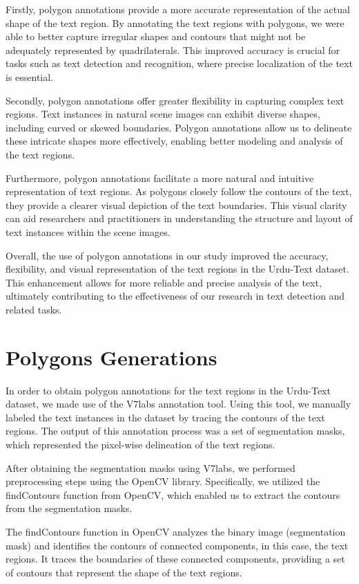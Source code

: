 Firstly, polygon annotations provide a more accurate representation of the actual shape of the text region. By annotating the text regions with polygons, we were able to better capture irregular shapes and contours that might not be adequately represented by quadrilaterals. This improved accuracy is crucial for tasks such as text detection and recognition, where precise localization of the text is essential.

Secondly, polygon annotations offer greater flexibility in capturing complex text regions. Text instances in natural scene images can exhibit diverse shapes, including curved or skewed boundaries. Polygon annotations allow us to delineate these intricate shapes more effectively, enabling better modeling and analysis of the text regions.

Furthermore, polygon annotations facilitate a more natural and intuitive representation of text regions. As polygons closely follow the contours of the text, they provide a clearer visual depiction of the text boundaries. This visual clarity can aid researchers and practitioners in understanding the structure and layout of text instances within the scene images.

Overall, the use of polygon annotations in our study improved the accuracy, flexibility, and visual representation of the text regions in the Urdu-Text dataset. This enhancement allows for more reliable and precise analysis of the text, ultimately contributing to the effectiveness of our research in text detection and related tasks.

\section{Polygons Generations}
In order to obtain polygon annotations for the text regions in the Urdu-Text dataset, we made use of the V7labs annotation tool. Using this tool, we manually labeled the text instances in the dataset by tracing the contours of the text regions. The output of this annotation process was a set of segmentation masks, which represented the pixel-wise delineation of the text regions.

After obtaining the segmentation masks using V7labs, we performed preprocessing steps using the OpenCV library. Specifically, we utilized the findContours function from OpenCV, which enabled us to extract the contours from the segmentation masks.

The findContours function in OpenCV analyzes the binary image (segmentation mask) and identifies the contours of connected components, in this case, the text regions. It traces the boundaries of these connected components, providing a set of contours that represent the shape of the text regions.


